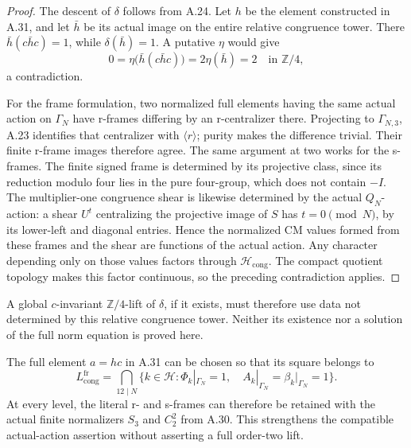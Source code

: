 \begin{proof}
The descent of \(\delta\) follows from A.24.
Let \(h\) be the element constructed in A.31,
and let \(\bar h\) be its actual image on the
entire relative congruence tower. There
\(\bar h(c\bar h c)=1\), while
\(\delta(\bar h)=1\). A putative \(\eta\)
would give
\[
 0=\eta\bigl(\bar h(c\bar h c)\bigr)
   =2\eta(\bar h)=2\quad\text{in }\mathbb Z/4,
\]
a contradiction.

For the frame formulation, two normalized full
elements having the same actual action on
\(\Gamma_N\) have r-frames differing by an
r-centralizer there. Projecting to
\(\Gamma_{N,3}\), A.23 identifies that centralizer
with \(\langle r\rangle\); purity makes the
difference trivial. Their finite r-frame images
therefore agree. The same argument at two works
for the s-frames. The finite signed frame is
determined by its projective class, since its
reduction modulo four lies in the pure four-group,
which does not contain \(-I\).
The multiplier-one congruence shear is likewise
determined by the actual \(Q_N\)-action: a shear
\(U^t\) centralizing the projective image of
\(S\) has \(t=0\pmod N\), by its lower-left
and diagonal entries. Hence the normalized CM
values formed from these frames and the shear
are functions of the actual action.
Any character depending only on those values
factors through \(\mathcal H_{\mathrm{cong}}\).
The compact quotient topology makes this factor
continuous, so the preceding contradiction applies.
\end{proof}

A global \(c\)-invariant \(\mathbb Z/4\)-lift of
\(\delta\), if it exists, must therefore use data
not determined by this relative congruence tower.
Neither its existence nor a solution of the full
norm equation is proved here.

The full element \(a=hc\) in A.31 can be chosen so that
its square belongs to
\[
 L_{\mathrm{cong}}^{\mathrm{fr}}=
 \bigcap_{12\mid N}\{k\in\mathcal H:
       \Phi_k|_{\Gamma_N}=1,\quad
       A_k|_{\Gamma_N}=\beta_k|_{\Gamma_N}=1\}.
 \tag{A.33.1}
\]
At every level, the literal r- and s-frames can therefore
be retained with the actual finite normalizers \(S_3\)
and \(C_2^2\) from A.30. This strengthens the compatible
actual-action assertion without asserting a full
order-two lift.

